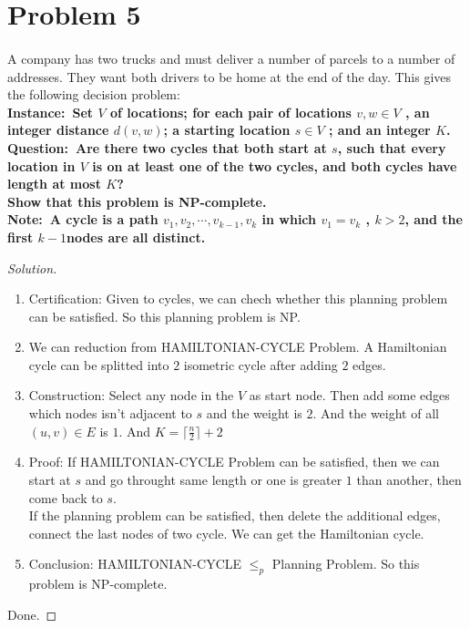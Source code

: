 \documentclass[a4paper]{article}
\newenvironment{solution}
  {\renewcommand\qedsymbol{$\blacksquare$}\begin{proof}[Solution]}
  {\end{proof}}
\begin{document}
\section*{Problem 5}
\paragraph{}
A company has two trucks and must deliver a number of parcels to a number of addresses. They want
both drivers to be home at the end of the day. This gives the following decision problem:\\
  \bfseries Instance:\ \mdseries Set $V$ of locations; for each pair of locations $v, w \in V$ , an integer distance $d(v, w)$; a starting
  location $s \in V$ ; and an integer $K$.\\
  \bfseries Question:\ \mdseries Are there two cycles that both start at $s$, such that every location in $V$ is on at least one of the
  two cycles, and both cycles have length at most $K$?\\
  Show that this problem is NP-complete.\\
  \bfseries Note:\ \mdseries A cycle is a path $v_{1} , v_{2} , \cdots, v_{k-1}, v_{k}$ in which $v_{1} = v_{k}$ , $k > 2$, and the first $k − 1 $nodes are all distinct.


\begin{solution}\
  \begin{enumerate}[(1)]
    \item Certification: Given to cycles, we can chech whether this planning problem can be satisfied. So this planning problem is NP.
    \item We can reduction from HAMILTONIAN-CYCLE Problem. A Hamiltonian cycle can be splitted into $2$ isometric cycle after adding $2$ edges.
    \item Construction: Select any node in the $V$ as start node. Then add some edges which nodes isn't adjacent to $s$ and the weight is $2$.
    And the weight of all $(u,v)\in E$ is $1$. And $K=\lceil \frac{n}{2}\rceil+2$
    \item Proof: If HAMILTONIAN-CYCLE Problem can be satisfied, then we can start at $s$ and go throught same length or one is greater $1$ than another, then come back to $s$.\\
    If the planning problem can be satisfied, then delete the additional edges, connect the last nodes of two cycle. We can get the Hamiltonian cycle.
    \item Conclusion: HAMILTONIAN-CYCLE $\le_{p}$ Planning Problem. So this problem is NP-complete.
  \end{enumerate}
  Done.
\end{solution}
\end{document}
